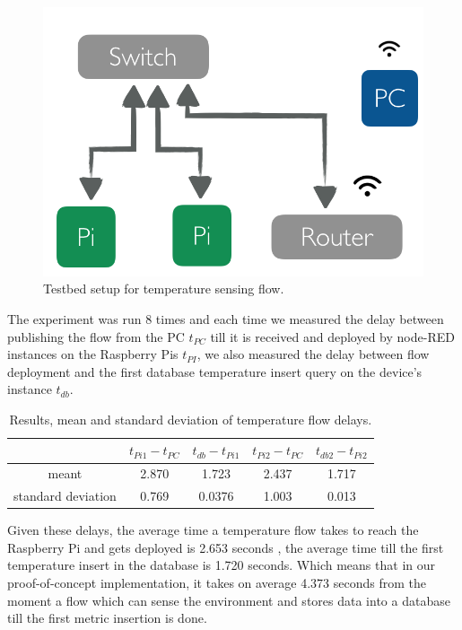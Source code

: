  \begin{figure}[H]
	\centering
	\includegraphics[scale=0.6]{images/tb-temp.png}
	\caption{Testbed setup for temperature sensing flow.}
	\label{fig:tb-temp}
\end{figure} 

\noindent The experiment was run 8 times and each time  we measured the delay between publishing the flow from the PC $ t_{PC}$ till it is received and deployed by  node-RED instances on the Raspberry Pis $t_{PI}$, we also measured the delay between flow deployment and the first database temperature insert query on the device's instance $t_{db}$. 
\begin{table}[H]
	\centering
	\begin{tabular}{*{5}{c}}\toprule
		&  $ t_{Pi1} - t_{PC}$   & $t_{db} - t_{Pi1}$  & $ t_{Pi2} - t_{PC}$ &  $t_{db2} - t_{Pi2}$ \\ \midrule
meant &2.870&	1.723&	2.437&	1.717\\
standard deviation& 0.769	&0.0376&	1.003&	0.013\\
	\end{tabular}
	\caption{Results, mean and standard deviation of temperature flow delays.}
	\label{table:temp}
\end{table}

\noindent Given these delays, the average time a temperature flow takes to reach the Raspberry Pi and gets deployed is 2.653 seconds , the average time till the first temperature insert in the database    is 1.720 seconds. Which means that in our proof-of-concept implementation, it takes on average 4.373 seconds from the moment a flow  which can sense the environment and stores data into a database till the first metric insertion is done.


